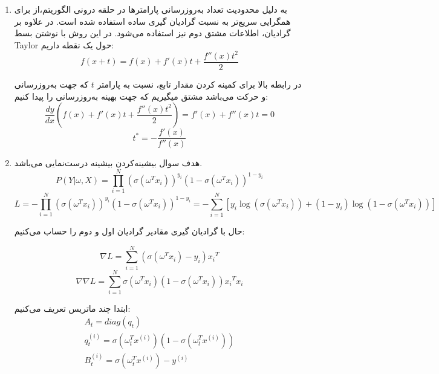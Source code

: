 \documentclass{article}
\begin{document}
\begin{enumerate}
	\item
	به دلیل محدودیت تعداد به‌روزرسانی پارامترها در حلقه درونی الگوریتم،‌از
	برای همگرایی سریع‌تر به نسبت گرادیان گیری ساده استفاده شده است.
	در
	علاوه بر گرادیان،‌ اطلاعات مشتق دوم نیز استفاده می‌شود.
	در این روش با نوشتن بسط Taylor حول یک نقطه داریم:
	$$
	f\left( {x + t} \right) = f\left( x \right) + f'\left( x \right)t + \frac{{f''\left( x \right){t^2}}}{2}
	$$
	
	در رابطه بالا برای کمینه کردن مقدار تابع، نسبت به پارامتر $t$ که جهت به‌روزرسانی و حرکت می‌باشد مشتق میگیریم که جهت بهینه به‌روزرسانی را پیدا کنیم:
	$$
	\frac{{dy}}{{dx}}\left( {f\left( x \right) + f'\left( x \right)t + \frac{{f''\left( x \right){t^2}}}{2}} \right) = f'\left( x \right) + f''\left( x \right)t = 0
	$$
	$$
	{t^*} =  - \frac{{f'\left( x \right)}}{{f''\left( x \right)}}
	$$
	
	\item
	
	هدف سوال بیشینه‌کردن بیشینه درست‌نمایی می‌باشد.
	$$
	P\left( {Y|\omega ,X} \right) = \prod\limits_{i = 1}^N {{{\left( {\sigma \left( {{\omega ^T}{x_i}} \right)} \right)}^{{y_i}}}{{\left( {1 - \sigma \left( {{\omega ^T}{x_i}} \right)} \right)}^{1 - {y_i}}}}
	$$
	$$
	L =  - \prod\limits_{i = 1}^N {{{\left( {\sigma \left( {{\omega ^T}{x_i}} \right)} \right)}^{{y_i}}}{{\left( {1 - \sigma \left( {{\omega ^T}{x_i}} \right)} \right)}^{1 - {y_i}}}}  =  - \sum\limits_{i = 1}^N {\left[ {{y_i}\log \left( {\sigma \left( {{\omega ^T}{x_i}} \right)} \right) + \left( {1 - {y_i}} \right)\log \left( {1 - \sigma \left( {{\omega ^T}{x_i}} \right)} \right)} \right]}
	$$
	
	حال با گرادیان گیری مقادیر گرادیان اول و دوم را حساب می‌کنیم:
	
	$$
	\nabla L = \sum\limits_{i = 1}^N {\left( {\sigma \left( {{\omega ^T}{x_i}} \right) - {y_i}} \right){x_i}^T}
	$$
	$$
	\nabla \nabla L = \sum\limits_{i = 1}^N {\sigma \left( {{\omega ^T}{x_i}} \right)\left( {1 - \sigma \left( {{\omega ^T}{x_i}} \right)} \right){x_i}^T{x_i}}
	$$
	
	ابتدا چند ماتریس تعریف می‌کنیم:
	$$
	\begin{array}{l}
		{A_t} = diag({q_t})\\
		q_t^{\left( i \right)} = \sigma \left( {\omega _t^T{x^{\left( i \right)}}} \right)\left( {1 - \sigma \left( {\omega _t^T{x^{\left( i \right)}}} \right)} \right)\\
		B_t^{\left( i \right)} = \sigma \left( {\omega _t^T{x^{\left( i \right)}}} \right) - {y^{\left( i \right)}}
	\end{array}
	$$
	

\end{enumerate}
\end{document}
